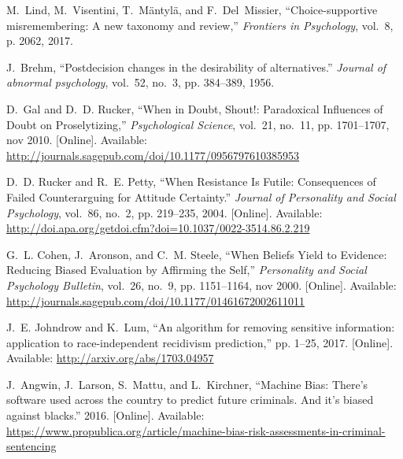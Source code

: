 \documentclass[11pt]{article}
\begin{document}
\begin{thebibliography}{44}
M.~Lind, M.~Visentini, T.~M{\"a}ntyl{\"a}, and F.~Del~Missier,
  ``Choice-supportive misremembering: A new taxonomy and review,''
  \emph{Frontiers in Psychology}, vol.~8, p. 2062, 2017.

J.~Brehm, ``{Postdecision changes in the desirability of alternatives.}''
  \emph{Journal of abnormal psychology}, vol.~52, no.~3, pp. 384--389, 1956.

\BIBentryALTinterwordspacing
D.~Gal and D.~D. Rucker, ``{When in Doubt, Shout!: Paradoxical Influences of
  Doubt on Proselytizing},'' \emph{Psychological Science}, vol.~21, no.~11, pp.
  1701--1707, nov 2010. [Online]. Available:
  \url{http://journals.sagepub.com/doi/10.1177/0956797610385953}
\BIBentrySTDinterwordspacing

\BIBentryALTinterwordspacing
D.~D. Rucker and R.~E. Petty, ``{When Resistance Is Futile: Consequences of
  Failed Counterarguing for Attitude Certainty.}'' \emph{Journal of Personality
  and Social Psychology}, vol.~86, no.~2, pp. 219--235, 2004. [Online].
  Available: \url{http://doi.apa.org/getdoi.cfm?doi=10.1037/0022-3514.86.2.219}
\BIBentrySTDinterwordspacing

\BIBentryALTinterwordspacing
G.~L. Cohen, J.~Aronson, and C.~M. Steele, ``{When Beliefs Yield to Evidence:
  Reducing Biased Evaluation by Affirming the Self},'' \emph{Personality and
  Social Psychology Bulletin}, vol.~26, no.~9, pp. 1151--1164, nov 2000.
  [Online]. Available:
  \url{http://journals.sagepub.com/doi/10.1177/01461672002611011}
\BIBentrySTDinterwordspacing

\BIBentryALTinterwordspacing
J.~E. Johndrow and K.~Lum, ``{An algorithm for removing sensitive information:
  application to race-independent recidivism prediction},'' pp. 1--25, 2017.
  [Online]. Available: \url{http://arxiv.org/abs/1703.04957}
\BIBentrySTDinterwordspacing

\BIBentryALTinterwordspacing
J.~Angwin, J.~Larson, S.~Mattu, and L.~Kirchner, ``{Machine Bias: There’s
  software used across the country to predict future criminals. And it’s
  biased against blacks.}'' 2016. [Online]. Available:
  \url{https://www.propublica.org/article/machine-bias-risk-assessments-in-criminal-sentencing}
\BIBentrySTDinterwordspacing


\end{thebibliography}
\end{document}
